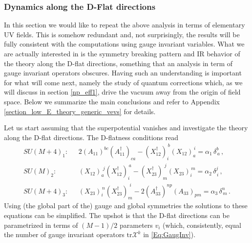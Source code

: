 \documentclass[a4paper,12pt]{article}
\begin{document}
\subsubsection*{Dynamics along the D-Flat directions} 
\label{Sec:DFlat}

In this section we would like to repeat the above analysis in terms of  elementary UV fields. This is somehow redundant and, not surprisingly, the results will be fully consistent with the computations using gauge invariant variables. What we are actually interested in is the symmetry breaking pattern and IR behavior of the theory along the D-flat directions, something that an analysis in term of gauge invariant operators obscures. Having such an understanding is important for what will come next, namely the study of quantum corrections which, as we will discuss in section \ref{np_eff1}, drive the vacuum away from the origin of field space. Below we summarize the main conclusions and refer to Appendix \ref{section_low_E_theory_generic_vevs} for details. 

Let us start assuming that the superpotential vanishes and investigate the theory along the D-flat directions. The D-flatness conditions read
	\begin{align}
SU(M+4)_1  :  \ \ \ & 2(A_{11})^{bc}(A_{11}^\dagger)_{ca} -  (X_{12}^\dagger)^{\, b}_{i}(X_{12})^{\, i}_{ a} =   \alpha_1  \, \delta^b_{\, a} \, , \label{Eq:Dterm1} \\
SU(M)_2	 :  \ \ \ &  (X_{12})^{\,\, j}_{ a}(X_{12}^\dagger)^{\, a}_{i} - (X_{23}^\dagger)^{\,\, j}_{m}(X_{23})^{\, m}_{ i}  =  \alpha_2  \, \delta^j_{\, i} \, , \label{Eq:Dterm2} \\
SU(M+4)_3 : \ \ \ & (X_{23})^{\, n}_{i}(X_{23}^\dagger)^{\,\, i}_{ m} - 2(A_{33}^\dagger)^{np}(A_{33})_{pm}  =  \alpha_3  \, \delta^n_{\, m} \, . \label{Eq:Dterm3}
	\end{align}
Using  (the global part of the) gauge and global symmetries the solutions to these equations can be simplified. The upshot is that the D-flat directions can be parametri\-zed in terms of $(M-1)/2$ parameters $v_i$ (which, consistently, equal the number of gauge invariant operators $\mathrm{tr} \mathcal{X}^k$ in \eqref{Eq:GaugInv}). 
\end{document}
